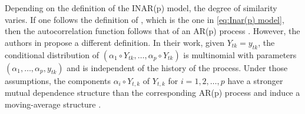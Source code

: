 Depending on the definition of the INAR(p) model, the degree of similarity varies. If one follows the definition of \cite{Guan:1991}, which is the one in \ref{eq:Inar(p) model}, then the autocorrelation function follows that of an AR(p) process \cite{Oliveira:2005}. However, the authors in \cite{Alzaid:1990} propose a different definition. In their work, given $Y_{tk}=y_{tk}$, the conditional distribution of $(\alpha_1 \circ Y_{tk}, \ldots, \alpha_p \circ Y_{tk})$ is multinomial with parameters $( \alpha_1,\ldots,\alpha_p,y_{tk})$ and is independent of the history of the process. Under those assumptions, the components $\alpha_i \circ Y_{t,k}$ of $Y_{t,k}$ for $i=1,2,\ldots,p$  have a stronger mutual dependence structure than the corresponding AR(p) process and induce a moving-average structure \cite{Alzaid:1990}.